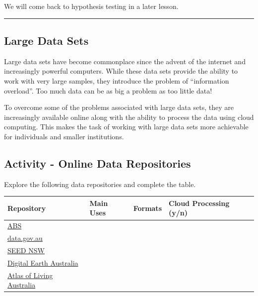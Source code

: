 \documentclass[
]{book}
\begin{document}
We will come back to hypothesis testing in a later lesson.

\begin{center}\rule{0.5\linewidth}{0.5pt}\end{center}

\subsection{Large Data Sets}\label{large-data-sets}

Large data sets have become commonplace since the advent of the internet and increasingly powerful computers. While these data sets provide the ability to work with very large samples, they introduce the problem of ``information overload''. Too much data can be as big a problem as too little data!

To overcome some of the problems associated with large data sets, they are increasingly available online along with the ability to process the data using cloud computing. This makes the task of working with large data sets more achievable for individuals and smaller institutions.

\subsection{Activity - Online Data Repositories}\label{activity---online-data-repositories}

Explore the following data repositories and complete the table.

\begin{longtable}[]{@{}
  >{\raggedright\arraybackslash}p{}
  >{\raggedright\arraybackslash}p{}
  >{\raggedright\arraybackslash}p{}
  >{\raggedright\arraybackslash}p{}@{}}
\toprule\noalign{}
\begin{minipage}[b]{\linewidth}\raggedright
Repository
\end{minipage} & \begin{minipage}[b]{\linewidth}\raggedright
Main Uses
\end{minipage} & \begin{minipage}[b]{\linewidth}\raggedright
Formats
\end{minipage} & \begin{minipage}[b]{\linewidth}\raggedright
Cloud Processing (y/n)
\end{minipage} \\
\midrule\noalign{}
\endhead
\bottomrule\noalign{}
\endlastfoot
\href{https://www.abs.gov.au/}{ABS} & & & \\
\href{https://data.gov.au/}{data.gov.au} & & & \\
\href{https://www.seed.nsw.gov.au/}{SEED NSW} & & & \\
\href{https://www.ga.gov.au/scientific-topics/dea}{Digital Earth Australia} & & & \\
\href{https://www.ala.org.au/}{Atlas of Living Australia} & & & \\
\end{longtable}
\end{document}
